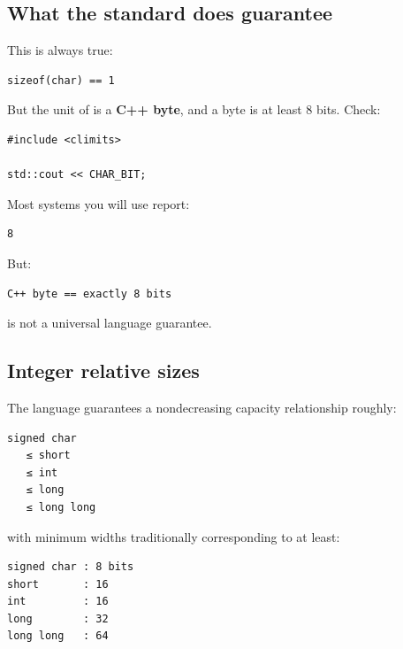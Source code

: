\subsection{What the standard does guarantee}\label{01-foundations-i-ch002-what-the-standard-does-guarantee}

\hypertarget{01-foundations-i-ch002-what-the-standard-does-guarantee}{}

This is always true:

\begin{verbatim}
sizeof(char) == 1
\end{verbatim}

But the unit of  is a \textbf{C++ byte}, and a byte is at least 8 bits. Check:

\begin{verbatim}
#include <climits>

std::cout << CHAR_BIT;
\end{verbatim}

Most systems you will use report:

\begin{verbatim}
8
\end{verbatim}

But:

\begin{verbatim}
C++ byte == exactly 8 bits
\end{verbatim}

is not a universal language guarantee.

\subsection{Integer relative sizes}\label{01-foundations-i-ch002-integer-relative-sizes}

\hypertarget{01-foundations-i-ch002-integer-relative-sizes}{}

The language guarantees a nondecreasing capacity relationship roughly:

\begin{verbatim}
signed char
   ≤ short
   ≤ int
   ≤ long
   ≤ long long
\end{verbatim}

with minimum widths traditionally corresponding to at least:

\begin{verbatim}
signed char : 8 bits
short       : 16
int         : 16
long        : 32
long long   : 64
\end{verbatim}

